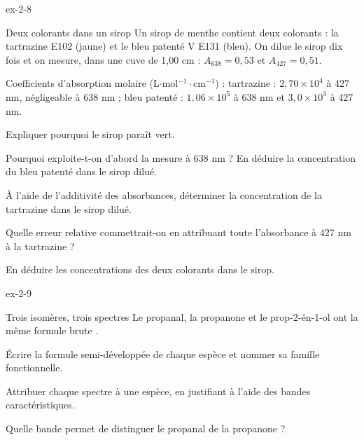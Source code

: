 \begin{blocLivre}{ex-2-8}
\begin{exercice}[2]{Deux colorants dans un sirop}
Un sirop de menthe contient deux colorants : la tartrazine E102 (jaune) et le bleu patenté V E131 (bleu).
On dilue le sirop dix fois et on mesure, dans une cuve de 1,00 cm : $A_{638}=0{,}53$ et $A_{427}=0{,}51$.
\begin{donnees}
Coefficients d'absorption molaire (L$\cdot$mol$^{-1}\cdot$cm$^{-1}$) : tartrazine : $2{,}70\times10^4$ à 427 nm,
négligeable à 638 nm ; bleu patenté : $1{,}06\times10^5$ à 638 nm et $3{,}0\times10^3$ à 427 nm.
\end{donnees}
\begin{questions}
\item Expliquer pourquoi le sirop paraît vert.
\item Pourquoi exploite-t-on d'abord la mesure à 638 nm ? En déduire la concentration du bleu patenté dans le sirop dilué.
\item À l'aide de l'additivité des absorbances, déterminer la concentration de la tartrazine dans le sirop dilué.
\item Quelle erreur relative commettrait-on en attribuant toute l'absorbance à 427 nm à la tartrazine ?
\item En déduire les concentrations des deux colorants dans le sirop.
\end{questions}
\end{exercice}
\end{blocLivre}
\begin{blocLivre}{ex-2-9}
\begin{exercice}[2]{Trois isomères, trois spectres}
Le propanal, la propanone et le prop-2-én-1-ol ont la même formule brute .
\begin{questions}
\item Écrire la formule semi-développée de chaque espèce et nommer sa famille fonctionnelle.
\item Attribuer chaque spectre à une espèce, en justifiant à l'aide des bandes caractéristiques.
\item Quelle bande permet de distinguer le propanal de la propanone ?
\end{questions}
\end{exercice}
\end{blocLivre}
